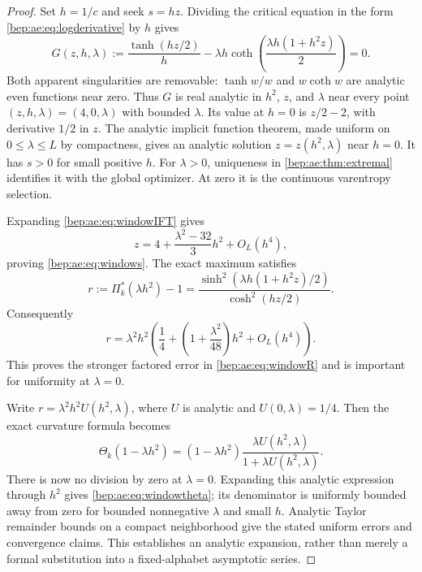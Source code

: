 \documentclass[11pt]{article}
\numberwithin{equation}{section}
\theoremstyle{definition}
\theoremstyle{remark}
\begin{document}
\begin{proof}
Set $h=1/c$ and seek $s=hz$. Dividing the critical equation in the form
\eqref{bep:ae:eq:logderivative} by $h$ gives
\begin{equation}\label{bep:ae:eq:windowIFT}
 G(z,h,\lambda):=
 \frac{\tanh(hz/2)}h
 -\lambda h\coth\!\left(\frac{\lambda h(1+h^2z)}2\right)=0.
\end{equation}
Both apparent singularities are removable: $\tanh w/w$ and $w\coth w$
are analytic even functions near zero. Thus $G$ is real analytic in
$h^2$, $z$, and $\lambda$ near every point $(z,h,\lambda)=(4,0,\lambda)$
with bounded $\lambda$. Its value at $h=0$ is $z/2-2$, with derivative
$1/2$ in $z$. The analytic implicit function theorem, made uniform on
$0\leq\lambda\leq L$ by compactness, gives an analytic solution
$z=z(h^2,\lambda)$ near $h=0$. It has $s>0$ for small positive $h$.
For $\lambda>0$, uniqueness in \cref{bep:ae:thm:extremal} identifies it with
the global optimizer. At zero it is the continuous varentropy selection.

Expanding \eqref{bep:ae:eq:windowIFT} gives
\[
 z=4+\frac{\lambda^2-32}{3}h^2+O_L(h^4),
\]
proving \eqref{bep:ae:eq:windows}. The exact maximum satisfies
\begin{equation}\label{bep:ae:eq:windowexactR}
 r:=\Pi^{*}_k(\lambda h^2)-1
 =\frac{\sinh^2\!\left(\lambda h(1+h^2z)/2\right)}
        {\cosh^2(hz/2)}.
\end{equation}
Consequently
\[
 r=\lambda^2h^2\left(\frac14+
                 \left(1+\frac{\lambda^2}{48}\right)h^2
                 +O_L(h^4)\right).
\]
This proves the stronger factored error in \eqref{bep:ae:eq:windowR} and is
important for uniformity at $\lambda=0$.

Write $r=\lambda^2h^2 U(h^2,\lambda)$, where $U$ is analytic and
$U(0,\lambda)=1/4$. Then the exact curvature formula becomes
\begin{equation}\label{bep:ae:eq:windowremovable}
 \Theta_k(1-\lambda h^2)
 =(1-\lambda h^2)\frac{\lambda U(h^2,\lambda)}
                             {1+\lambda U(h^2,\lambda)}.
\end{equation}
There is now no division by zero at $\lambda=0$. Expanding this analytic
expression through $h^2$ gives \eqref{bep:ae:eq:windowtheta}; its denominator is
uniformly bounded away from zero for bounded nonnegative $\lambda$ and
small $h$. Analytic Taylor remainder bounds on a compact neighborhood
give the stated uniform errors and convergence claims. This establishes
an analytic expansion, rather than merely a formal substitution into a
fixed-alphabet asymptotic series.
\end{proof}
\end{document}
